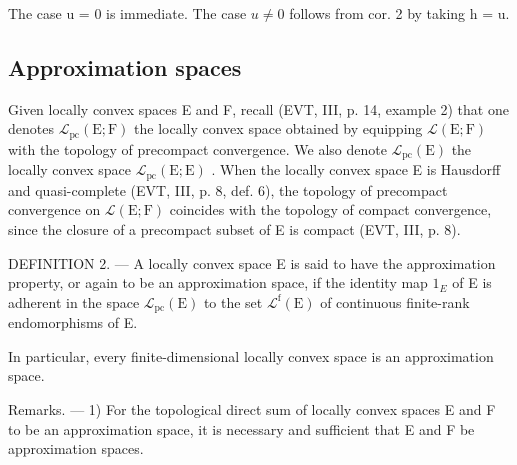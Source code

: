 The case u = 0 is immediate. The case \(u \neq 0\) follows from cor. 2 by taking h = u.

\subsection{Approximation spaces}

Given locally convex spaces E and F, recall (EVT, III, p. 14, example 2) that one denotes \(\mathcal{L}_{\mathrm{pc}}(\mathrm{E};\mathrm{F})\) the locally convex space obtained by equipping \(\mathcal{L}(\mathrm{E};\mathrm{F})\) with the topology of precompact convergence. We also denote \(\mathcal{L}_{\mathrm{pc}}(\mathrm{E})\) the locally convex space \(\mathcal{L}_{\mathrm{pc}}(\mathrm{E};\mathrm{E})\) . When the locally convex space E is Hausdorff and quasi-complete (EVT, III, p. 8, def. 6), the topology of precompact convergence on \(\mathcal{L}(\mathrm{E};\mathrm{F})\) coincides with the topology of compact convergence, since the closure of a precompact subset of E is compact (EVT, III, p. 8).

DEFINITION 2. --- A locally convex space E is said to have the approximation property, or again to be an approximation space, if the identity map \(1_{E}\) of E is adherent in the space \(\mathcal{L}_{\mathrm{pc}}(\mathrm{E})\) to the set \(\mathcal{L}^{\mathrm{f}}(\mathrm{E})\) of continuous finite-rank endomorphisms of E.

In particular, every finite-dimensional locally convex space is an approximation space.

Remarks. --- 1) For the topological direct sum of locally convex spaces E and F to be an approximation space, it is necessary and sufficient that E and F be approximation spaces.

